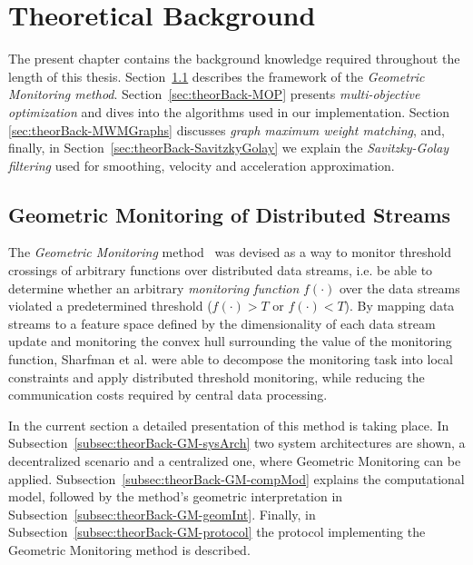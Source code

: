  \chapter{Theoretical Background} \label{chap:theorBack}

The present chapter contains the background knowledge required throughout the length of this thesis. Section~\ref{sec:theorBack-GM} describes the framework of the \emph{Geometric Monitoring method}. Section~\ref{sec:theorBack-MOP} presents \emph{multi-objective optimization} and  dives into the algorithms used in our implementation. Section \ref{sec:theorBack-MWMGraphs} discusses \emph{graph maximum weight matching}, and, finally, in Section~\ref{sec:theorBack-SavitzkyGolay} we explain the \emph{Savitzky-Golay filtering} used for smoothing, velocity and acceleration approximation.


\section{Geometric Monitoring of Distributed Streams} \label{sec:theorBack-GM}
 
The \emph{Geometric Monitoring} method~\cite{Sharfman2006GM} was devised as a way to monitor threshold crossings of arbitrary functions over distributed data streams, i.e. be able to determine whether an arbitrary \emph{monitoring function} $f(\cdot)$ over the data streams violated a predetermined threshold ($f(\cdot)>T$ or $f(\cdot)<T$). By mapping data streams to a feature space defined by the dimensionality of each data stream update and monitoring the convex hull surrounding the value of the monitoring function, Sharfman et al. were able to decompose the monitoring task into local constraints and apply distributed threshold monitoring, while reducing the communication costs required by central data processing.

In the current section a detailed presentation of this method is taking place. In Subsection~\ref{subsec:theorBack-GM-sysArch} two system architectures are shown, a decentralized scenario and a centralized one, where Geometric Monitoring can be applied. Subsection~\ref{subsec:theorBack-GM-compMod} explains the computational model, followed by the method's geometric interpretation in Subsection~\ref{subsec:theorBack-GM-geomInt}. Finally, in Subsection~\ref{subsec:theorBack-GM-protocol} the protocol implementing the Geometric Monitoring method is described.

